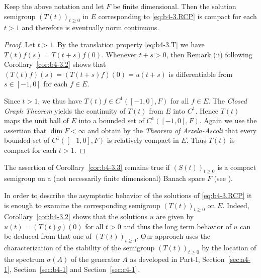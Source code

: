 \begin{corollary}\label{cor:b4-3.3}
	Keep the above notation and let $F$ be finite dimensional. 
    Then the solution semigroup $(T(t))_{t \geq 0}$ in $E$ corresponding to \eqref{eq:b4-3.RCP} is compact for each $t > 1$ and therefore is eventually norm continuous.
\end{corollary}
\begin{proof} 
Let $t > 1$. 
By the translation property \eqref{eq:b4-3.T} we have $T(t)f(s) = T(t+s)f(0)$. Whenever $t + s > 0$, then Remark (ii) following Corollary~\ref{cor:b4-3.2} shows that $(T(t)f)(s) = (T(t+s)f)(0) = u(t+s)$ is differentiable from $s \in [-1,0]$ for each $f \in E$.

Since $t > 1$, we thus have $T(t)f \in C^1([-1,0],F)$ for all $f \in E$. 
The \emph{Closed Graph Theorem} yields the continuity of\/ $T(t)$ from $E$ into $C^1$. 
Hence $T(t)$ maps the unit ball of\/ $E$ into a bounded set of\/ $C^1([-1,0],F)$. 
Again we use the assertion that $\dim F < \infty$ and obtain by the \emph{Theorem of Arzela-Ascoli} that every bounded set of\/ $C^1([-1,0],F)$ is relatively compact in $E$. 
Thus $T(t)$ is compact for each $t > 1$.
\end{proof}
The assertion of Corollary~\ref{cor:b4-3.3} remains true if\/ $(S(t))_{t \geq 0}$ is a compact semigroup on a (not necessarily finite dimensional) Banach space $F$ (see \textcite{traviswebb:1974}).

In order to describe the asymptotic behavior of the solutions of \eqref{eq:b4-3.RCP} it is enough to examine the corresponding semigroup $(T(t))_{t \geq 0}$ on $E$. 
Indeed, Corollary~\ref{cor:b4-3.2} shows that the solutions $u$ are given by $u(t) = (T(t)g)(0)$ for all $t > 0$ and thus the long term behavior of\/ $u$ can be deduced from that one of\/ $(T(t))_{t \geq 0}$. 
Our approach uses the characterization of the stability of the semigroup $(T(t))_{t \geq 0}$ by the location of the spectrum $\sigma(A)$ of the generator $A$ as developed in Part-I, Section~\ref{sec:a4-1},  Section~\ref{sec:b4-1} and Section~\ref{sec:c4-1}.

